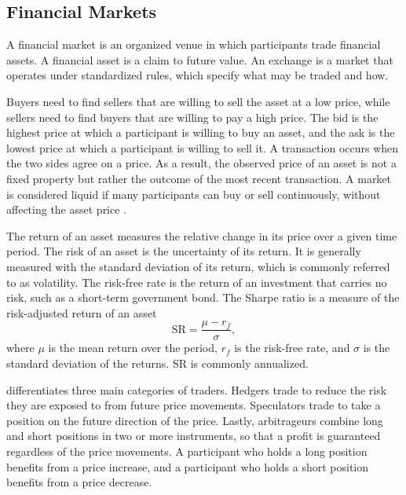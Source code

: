 \subsection{Financial Markets}\label{sec:financial-markets}
A financial market is an organized venue in which participants trade financial assets. A financial asset is a claim to future value.  An exchange is a market that operates under standardized rules, which specify what may be traded and how. 

Buyers need to find sellers that are willing to sell the asset at a low price, while sellers need to find buyers that are willing to pay a high price. The bid is the highest price at which a participant is willing to buy an asset, and the ask is the lowest price at which a participant is willing to sell it. A transaction occurs when the two sides agree on a price. As a result, the observed price of an asset is not a fixed property but rather the outcome of the most recent transaction. A market is considered liquid if many participants can buy or sell continuously, without affecting the asset price \parencite[3--7]{harrisTradingExchangesMarket2003}. 

The return of an asset measures the relative change in its price over a given time period. The risk of an asset is the uncertainty of its return. It is generally measured with the standard deviation of its return, which is commonly referred to as volatility. The risk-free rate is the return of an investment that carries no risk, such as a short-term government bond. The Sharpe ratio is a measure of the risk-adjusted return of an asset
\begin{equation}
\mathrm{SR} = \frac{\mu - r_f}{\sigma},
\label{eq:std-sharpe-ratio}
\end{equation}
where $\mu$ is the mean return over the period, $r_f$ is the risk-free rate, and $\sigma$ is the standard deviation of the returns. $\mathrm{SR}$ is commonly annualized.

\textcite[33]{hullOptionsFuturesOther2022} differentiates three main categories of traders. Hedgers trade to reduce the risk they are exposed to from future price movements. Speculators trade to take a position on the future direction of the price. Lastly, arbitrageurs combine long and short positions in two or more instruments, so that a profit is guaranteed regardless of the price movements. A participant who holds a long position benefits from a price increase, and a participant who holds a short position benefits from a price decrease.


